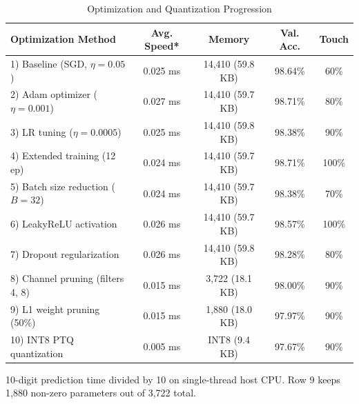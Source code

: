 \begin{table}[t]
\centering
\scriptsize
\setlength{\tabcolsep}{1.4pt}
\renewcommand{\arraystretch}{0.88}
\caption{Optimization and Quantization Progression}
\label{tab:optimizations}
\begin{tabular}{lcccc}
\toprule
\textbf{Optimization Method} & \textbf{Avg. Speed*} & \textbf{Memory} & \textbf{Val. Acc.} & \textbf{Touch} \\
\midrule
1) Baseline (SGD, $\eta=0.05$) & 0.025 ms & 14,410 (59.8 KB) & 98.64\% & 60\% \\
2) Adam optimizer ($\eta=0.001$) & 0.027 ms & 14,410 (59.7 KB) & 98.71\% & 80\% \\
3) LR tuning ($\eta=0.0005$) & 0.025 ms & 14,410 (59.8 KB) & 98.38\% & 90\% \\
4) Extended training (12 ep) & 0.024 ms & 14,410 (59.7 KB) & 98.71\% & 100\% \\
5) Batch size reduction ($B=32$) & 0.024 ms & 14,410 (59.7 KB) & 98.38\% & 70\% \\
6) LeakyReLU activation & 0.026 ms & 14,410 (59.7 KB) & 98.57\% & 100\% \\
7) Dropout regularization & 0.026 ms & 14,410 (59.8 KB) & 98.28\% & 80\% \\
8) Channel pruning (filters 4, 8) & 0.015 ms & 3,722 (18.1 KB) & 98.00\% & 90\% \\
9) L1 weight pruning (50\%) & 0.015 ms & 1,880 (18.0 KB) & 97.97\% & 90\% \\
10) INT8 PTQ quantization & 0.005 ms & INT8 (9.4 KB) & 97.67\% & 90\% \\
\bottomrule
\end{tabular}\par
\vspace{2pt}
{\raggedright \tiny *10-digit prediction time divided by 10 on single-thread host CPU. Row 9 keeps 1,880 non-zero parameters out of 3,722 total.\par}
\end{table}